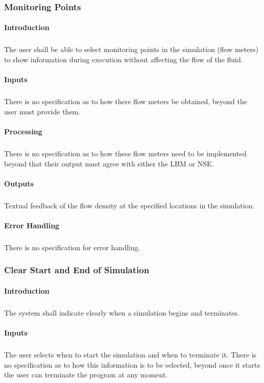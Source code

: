 \documentclass{scrartcl}
\begin{document}
\subsubsection{Monitoring Points}
\paragraph{Introduction}
\subparagraph{}
The user shall be able to select monitoring points in the simulation (flow meters) to show information during execution without affecting the flow of the fluid.

\paragraph{Inputs}
\subparagraph{}
There is no specification as to how there flow meters be obtained, beyond the user must provide them.

\paragraph{Processing}
\subparagraph{}
There is no specification as to how these flow meters need to be implemented beyond that their output must agree with either the LBM or NSE.

\paragraph{Outputs}
\subparagraph{}
Textual feedback of the flow density at the specified locations in the simulation. 

\paragraph{Error Handling}
\subparagraph{}
There is no specification for error handling. 





\subsubsection{Clear Start and End of Simulation}
\paragraph{Introduction}
\subparagraph{}
The system shall indicate clearly when a simulation begins and terminates.

\paragraph{Inputs}
\subparagraph{}
The user selects when to start the simulation and when to terminate it. There is no specification as to how this information is to be selected, beyond once it starts the user can terminate the program at any moment.
\end{document}
